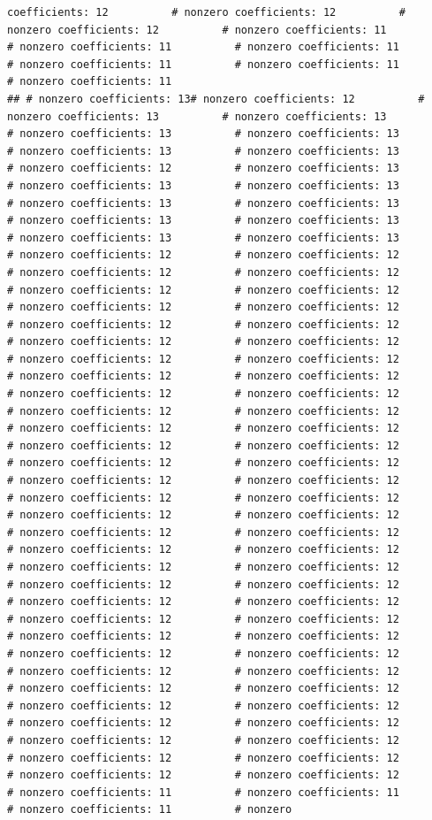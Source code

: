 \documentclass[
]{article}
\begin{document}
\begin{verbatim}
coefficients: 12          # nonzero coefficients: 12          # nonzero coefficients: 12          # nonzero coefficients: 11          # nonzero coefficients: 11          # nonzero coefficients: 11          # nonzero coefficients: 11          # nonzero coefficients: 11          # nonzero coefficients: 11          
## # nonzero coefficients: 13# nonzero coefficients: 12          # nonzero coefficients: 13          # nonzero coefficients: 13          # nonzero coefficients: 13          # nonzero coefficients: 13          # nonzero coefficients: 13          # nonzero coefficients: 13          # nonzero coefficients: 12          # nonzero coefficients: 13          # nonzero coefficients: 13          # nonzero coefficients: 13          # nonzero coefficients: 13          # nonzero coefficients: 13          # nonzero coefficients: 13          # nonzero coefficients: 13          # nonzero coefficients: 13          # nonzero coefficients: 13          # nonzero coefficients: 12          # nonzero coefficients: 12          # nonzero coefficients: 12          # nonzero coefficients: 12          # nonzero coefficients: 12          # nonzero coefficients: 12          # nonzero coefficients: 12          # nonzero coefficients: 12          # nonzero coefficients: 12          # nonzero coefficients: 12          # nonzero coefficients: 12          # nonzero coefficients: 12          # nonzero coefficients: 12          # nonzero coefficients: 12          # nonzero coefficients: 12          # nonzero coefficients: 12          # nonzero coefficients: 12          # nonzero coefficients: 12          # nonzero coefficients: 12          # nonzero coefficients: 12          # nonzero coefficients: 12          # nonzero coefficients: 12          # nonzero coefficients: 12          # nonzero coefficients: 12          # nonzero coefficients: 12          # nonzero coefficients: 12          # nonzero coefficients: 12          # nonzero coefficients: 12          # nonzero coefficients: 12          # nonzero coefficients: 12          # nonzero coefficients: 12          # nonzero coefficients: 12          # nonzero coefficients: 12          # nonzero coefficients: 12          # nonzero coefficients: 12          # nonzero coefficients: 12          # nonzero coefficients: 12          # nonzero coefficients: 12          # nonzero coefficients: 12          # nonzero coefficients: 12          # nonzero coefficients: 12          # nonzero coefficients: 12          # nonzero coefficients: 12          # nonzero coefficients: 12          # nonzero coefficients: 12          # nonzero coefficients: 12          # nonzero coefficients: 12          # nonzero coefficients: 12          # nonzero coefficients: 12          # nonzero coefficients: 12          # nonzero coefficients: 12          # nonzero coefficients: 12          # nonzero coefficients: 12          # nonzero coefficients: 12          # nonzero coefficients: 12          # nonzero coefficients: 12          # nonzero coefficients: 12          # nonzero coefficients: 12          # nonzero coefficients: 12          # nonzero coefficients: 12          # nonzero coefficients: 12          # nonzero coefficients: 12          # nonzero coefficients: 11          # nonzero coefficients: 11          # nonzero coefficients: 11          # nonzero 
\end{verbatim}
\end{document}
